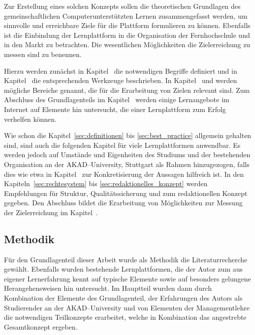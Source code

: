 Zur Erstellung eines solchen Konzepts sollen die theoretischen Grundlagen des gemeinschaftlichen Computerunterstützten Lernen zusammengefasst werden, um sinnvolle und erreichbare Ziele für die Plattform formulieren zu können. Ebenfalls ist die Einbindung der Lernplattform in die Organisation der Fernhochschule und in den Markt zu betrachten. Die wesentlichen Möglichkeiten die Zielerreichung zu messen sind zu benennen.

Hierzu werden zunächst in Kapitel~ die notwendigen Begriffe definiert und in Kapitel~ die entsprechenden Werkzeuge beschrieben. In Kapitel~ und  werden mögliche Bereiche genannt, die für die Erarbeitung von Zielen relevant sind. Zum Abschluss des Grundlagenteils im Kapitel~ werden einige Lernangebote im Internet auf Elemente hin untersucht, die einer Lernplattform zum Erfolg verhelfen können.

Wie schon die Kapitel~\ref{sec:definitionen} bis \ref{sec:best_practice} allgemein gehalten sind, sind auch die folgenden Kapitel für viele Lernplattformen anwendbar. Es werden jedoch auf Umstände und Eigenheiten des Studiums und der bestehenden Organisation an der AKAD–University, Stuttgart als Rahmen hinzugezogen, falls dies wie etwa in Kapitel~ zur Konkretisierung der Aussagen hilfreich ist. In den Kapiteln~\ref{sec:rechtesystem} bis \ref{sec:redaktionelles_konzept} werden Empfehlungen für Struktur, Qualitätssicherung und zum redaktionellen Konzept gegeben. Den Abschluss bildet die Erarbeitung von Möglichkeiten zur Messung der Zielerreichung im Kapitel~.

\subsection{Methodik} %
\label{sub:methodik}
Für den Grundlagenteil dieser Arbeit wurde als Methodik die Literaturrecherche gewählt. Ebenfalls wurden bestehende Lernplattformen, die der Autor zum aus eigener Lernerfahrung kennt auf typische Elemente sowie auf besonders gelungene Herangehensweisen hin untersucht. Im Hauptteil wurden dann durch Kombination der Elemente des Grundlagenteil, der Erfahrungen des Autors als Studierender an der AKAD–University und von Elementen der Managementlehre die notwendigen Teilkonzepte erarbeitet, welche in Kombination das angestrebte Gesamtkonzept ergeben.

